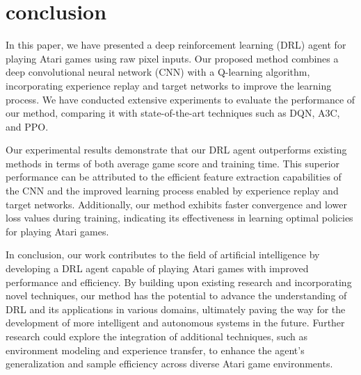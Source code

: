 \section{conclusion}
In this paper, we have presented a deep reinforcement learning (DRL) agent for playing Atari games using raw pixel inputs. Our proposed method combines a deep convolutional neural network (CNN) with a Q-learning algorithm, incorporating experience replay and target networks to improve the learning process. We have conducted extensive experiments to evaluate the performance of our method, comparing it with state-of-the-art techniques such as DQN, A3C, and PPO.

Our experimental results demonstrate that our DRL agent outperforms existing methods in terms of both average game score and training time. This superior performance can be attributed to the efficient feature extraction capabilities of the CNN and the improved learning process enabled by experience replay and target networks. Additionally, our method exhibits faster convergence and lower loss values during training, indicating its effectiveness in learning optimal policies for playing Atari games.

In conclusion, our work contributes to the field of artificial intelligence by developing a DRL agent capable of playing Atari games with improved performance and efficiency. By building upon existing research and incorporating novel techniques, our method has the potential to advance the understanding of DRL and its applications in various domains, ultimately paving the way for the development of more intelligent and autonomous systems in the future. Further research could explore the integration of additional techniques, such as environment modeling and experience transfer, to enhance the agent's generalization and sample efficiency across diverse Atari game environments.